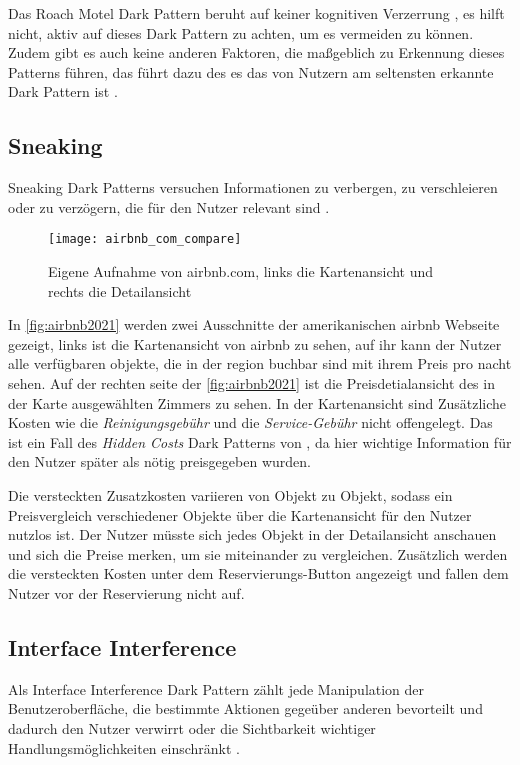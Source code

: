 \documentclass[conference,compsoc,final,a4paper]{IEEEtran}
\begin{document}
Das Roach Motel Dark Pattern beruht auf keiner kognitiven Verzerrung \autocite{Mathur2019}, es hilft nicht, aktiv auf dieses Dark Pattern zu achten, um es vermeiden zu können. Zudem gibt es auch keine anderen Faktoren, die maßgeblich zu Erkennung dieses Patterns führen, das führt dazu des es das von Nutzern am seltensten erkannte Dark Pattern ist \autocite{M.Bhoot2020}.
\subsection{Sneaking}
Sneaking Dark Patterns versuchen Informationen zu verbergen, zu verschleieren oder zu verzögern, die für den Nutzer relevant sind \autocite{Gray_2018}.

\begin{figure}[ht!]
  \centering
  \texttt{[image: airbnb\_com\_compare]}
  \caption{Eigene Aufnahme von airbnb.com, links die Kartenansicht und rechts die Detailansicht ~\autocite{airbnb2021}}
  \label{fig:airbnb2021}
\end{figure}

In \autoref{fig:airbnb2021} werden zwei Ausschnitte der amerikanischen airbnb Webseite gezeigt, links ist die Kartenansicht von airbnb zu sehen, auf ihr kann der Nutzer alle verfügbaren objekte, die in der region buchbar sind mit ihrem Preis pro nacht sehen. Auf der rechten seite der \autoref{fig:airbnb2021} ist die Preisdetialansicht des in der Karte ausgewählten Zimmers zu sehen. In der Kartenansicht sind Zusätzliche Kosten wie die \textit{Reinigungsgebühr} und die \textit{Service-Gebühr} nicht offengelegt. Das ist ein Fall des \textit{Hidden Costs} Dark Patterns von \citeauthor{Brignull} \autocite{Brignull}, da hier wichtige Information für den Nutzer später als nötig preisgegeben wurden.

Die versteckten Zusatzkosten variieren von Objekt zu Objekt, sodass ein Preisvergleich verschiedener Objekte über die Kartenansicht für den Nutzer nutzlos ist. Der Nutzer müsste sich jedes Objekt in der Detailansicht anschauen und sich die Preise merken, um sie miteinander zu vergleichen. Zusätzlich werden die versteckten Kosten unter dem Reservierungs-Button angezeigt und fallen dem Nutzer vor der Reservierung nicht auf.

\subsection{Interface Interference}
Als Interface Interference Dark Pattern zählt jede Manipulation der Benutzeroberfläche, die bestimmte Aktionen gegeüber anderen bevorteilt und dadurch den Nutzer verwirrt oder die Sichtbarkeit wichtiger Handlungsmöglichkeiten einschränkt \autocite{Gray_2018}.
\end{document}
